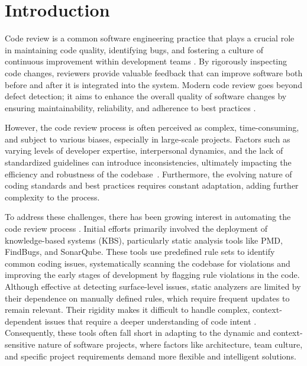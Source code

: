 \section{Introduction}
\label{sec:intro}

Code review is a common software engineering practice that plays a crucial role in maintaining code quality, identifying bugs, and fostering a culture of continuous improvement within development teams \cite{ccetin2021review,xiaomeng2018survey}. By rigorously inspecting code changes, reviewers provide valuable feedback that can improve software both before and after it is integrated into the system. Modern code review goes beyond defect detection; it aims to enhance the overall quality of software changes by ensuring maintainability, reliability, and adherence to best practices \cite{hong2022commentfinder, bavota2015four}.

However, the code review process is often perceived as complex, time-consuming, and subject to various biases, especially in large-scale projects. Factors such as varying levels of developer expertise, interpersonal dynamics, and the lack of standardized guidelines can introduce inconsistencies, ultimately impacting the efficiency and robustness of the codebase~\cite{ben2024improving}. Furthermore, the evolving nature of coding standards and best practices requires constant adaptation, adding further complexity to the process.

To address these challenges, there has been growing interest in automating the code review process \cite{hovemeyer2004finding}. Initial efforts primarily involved the deployment of knowledge-based systems (KBS), particularly static analysis tools like PMD, FindBugs, and SonarQube. These tools use predefined rule sets to identify common coding issues, systematically scanning the codebase for violations and improving the early stages of development by flagging rule violations in the code. Although effective at detecting surface-level issues, static analyzers are limited by their dependence on manually defined rules, which require frequent updates to remain relevant. Their rigidity makes it difficult to handle complex, context-dependent issues that require a deeper understanding of code intent \cite{sadowski2015tricorder}. Consequently, these tools often fall short in adapting to the dynamic and context-sensitive nature of software projects, where factors like architecture, team culture, and specific project requirements demand more flexible and intelligent solutions.

